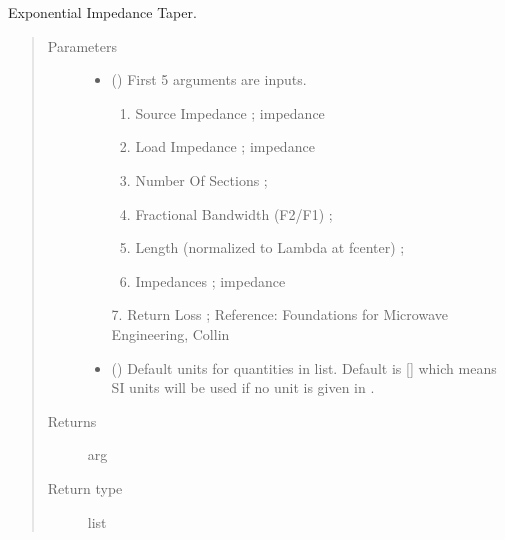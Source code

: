 \documentclass[letterpaper,10pt,english]{sphinxmanual}
\begin{document}
\begin{fulllineitems}
\label{\detokenize{components:components.Exponential_Taper_Impedance_Transformer}}
Exponential Impedance Taper.
\begin{quote}\begin{description}
\item[{Parameters}] \leavevmode\begin{itemize}
\item {} 
 () \textendash{} 
First 5 arguments are inputs.
\begin{enumerate}
%
\item {} 
Source Impedance ; impedance

\item {} 
Load Impedance ; impedance

\item {} 
Number Of Sections ;

\item {} 
Fractional Bandwidth (F2/F1) ;

\item {} 
Length (normalized to Lambda at fcenter) ;

\item {} 
Impedances ; impedance

\end{enumerate}

7.  Return Loss ;
Reference:  Foundations for Microwave Engineering, Collin


\item {} 
 (\sphinxstyleliteralemphasis{\sphinxupquote{, }}) \textendash{} Default units for quantities in  list. Default is {[}{]} which means SI units will be used if no unit is given in .

\end{itemize}

\item[{Returns}] \leavevmode
arg

\item[{Return type}] \leavevmode
list

\end{description}\end{quote}

\end{fulllineitems}
\end{document}
